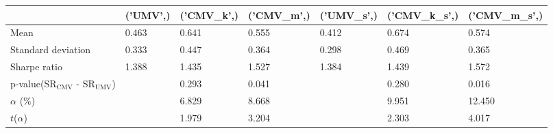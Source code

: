 \begin{tabular}{lllllll}
\toprule
 & ('UMV',) & ('CMV_k',) & ('CMV_m',) & ('UMV_s',) & ('CMV_k_s',) & ('CMV_m_s',) \\
\midrule
Mean & 0.463 & 0.641 & 0.555 & 0.412 & 0.674 & 0.574 \\
Standard deviation & 0.333 & 0.447 & 0.364 & 0.298 & 0.469 & 0.365 \\
Sharpe ratio & 1.388 & 1.435 & 1.527 & 1.384 & 1.439 & 1.572 \\
p-value(SR$_{\text{CMV}}$ - SR$_{\text{UMV}}$) &  & 0.293 & 0.041 &  & 0.280 & 0.016 \\
$\alpha$ (\%) &  & 6.829 & 8.668 &  & 9.951 & 12.450 \\
$t$($\alpha$) &  & 1.979 & 3.204 &  & 2.303 & 4.017 \\
\bottomrule
\end{tabular}
